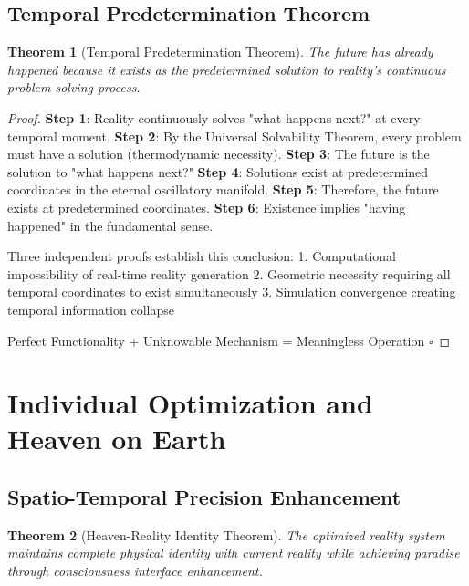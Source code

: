 \documentclass[12pt,a4paper]{article}
\newtheorem{theorem}{Theorem}[section]
\begin{document}
\subsection{Temporal Predetermination Theorem}

\begin{theorem}[Temporal Predetermination Theorem]
The future has already happened because it exists as the predetermined solution to reality's continuous problem-solving process.
\end{theorem}

\begin{proof}
\textbf{Step 1}: Reality continuously solves "what happens next?" at every temporal moment.
\textbf{Step 2}: By the Universal Solvability Theorem, every problem must have a solution (thermodynamic necessity).
\textbf{Step 3}: The future is the solution to "what happens next?"
\textbf{Step 4}: Solutions exist at predetermined coordinates in the eternal oscillatory manifold.
\textbf{Step 5}: Therefore, the future exists at predetermined coordinates.
\textbf{Step 6}: Existence implies "having happened" in the fundamental sense.

Three independent proofs establish this conclusion:
1. Computational impossibility of real-time reality generation
2. Geometric necessity requiring all temporal coordinates to exist simultaneously  
3. Simulation convergence creating temporal information collapse

Perfect Functionality + Unknowable Mechanism = Meaningless Operation $\square$
\end{proof}

\section{Individual Optimization and Heaven on Earth}

\subsection{Spatio-Temporal Precision Enhancement}

\begin{theorem}[Heaven-Reality Identity Theorem]
The optimized reality system maintains complete physical identity with current reality while achieving paradise through consciousness interface enhancement.
\end{theorem}
\end{document}
